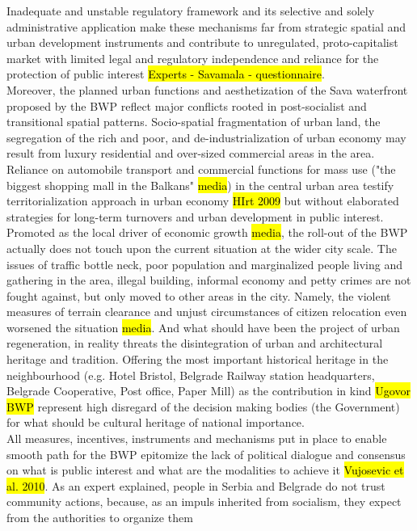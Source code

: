 \documentclass[11pt]{report}
\begin{document}
Inadequate and unstable regulatory framework and its selective and solely administrative application make these mechanisms far from strategic spatial and urban development instruments and contribute to unregulated, proto-capitalist market with limited legal and regulatory independence and reliance for the protection of public interest \hl{Experts - Savamala - questionnaire}.
\\
Moreover, the planned urban functions and aesthetization of the Sava waterfront proposed by the BWP reflect major conflicts rooted in post-socialist and transitional spatial patterns. Socio-spatial fragmentation of urban land, the segregation of the rich and poor, and de-industrialization of urban economy may result from luxury residential and over-sized commercial areas in the area.
Reliance on automobile transport and commercial functions for mass use ("the biggest shopping mall in the Balkans" \hl{media}) in the central urban area testify territorialization approach in urban economy \hl{HIrt 2009} but without elaborated strategies for long-term turnovers and urban development in public interest.
Promoted as the local driver of economic growth \hl{media}, the roll-out of the BWP actually does not touch upon the current situation at the wider city scale.
The issues of traffic bottle neck, poor population and marginalized people living and gathering in the area, illegal building, informal economy and petty crimes are not fought against, but only moved to other areas in the city. Namely, the violent measures of terrain clearance and unjust circumstances of citizen relocation even worsened the situation \hl{media}.
And what should have been the project of urban regeneration, in reality threats the disintegration of urban and architectural heritage and tradition. Offering the most important historical heritage in the neighbourhood (e.g. Hotel Bristol, Belgrade Railway station headquarters, Belgrade Cooperative, Post office, Paper Mill) as the contribution in kind \hl{Ugovor BWP} represent high disregard  of the decision making bodies (the Government) for what should be cultural heritage of national importance.
\\
All measures, incentives, instruments and mechanisms put in place to enable smooth path for the BWP epitomize the lack of political dialogue and consensus on what is public interest and what are the modalities to achieve it \hl{Vujosevic et al. 2010}. %
As an expert explained, people in Serbia and Belgrade do not trust community actions, because, as an impuls inherited from socialism, they expect from the authorities to organize them
\end{document}
